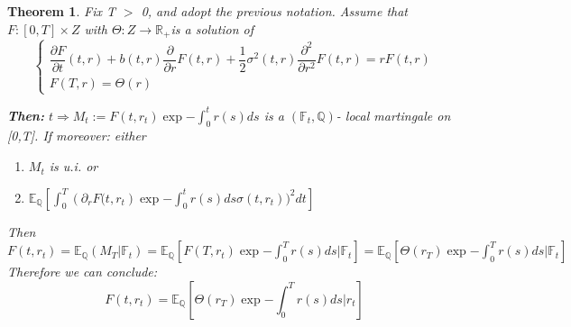 \documentclass[10pt, oneside, reqno]{amsbook}
\theoremstyle{plain}%
\newtheorem{thm}{Theorem}[chapter]
\theoremstyle{definition}
\theoremstyle{rem}
\theoremstyle{definition}
\def\Qbb{\ensuremath{\mathbb{Q}}}
\def\Rbb{\ensuremath{\mathbb{R}}}
\newcommand{\gt}{>}
\newcommand{\F}{\mathbb{F}}
\numberwithin{equation}{chapter}
\begin{document}
\begin{thm}
 Fix T $\gt$ 0, and adopt the previous notation. Assume that
$F:[0,T] \times Z$ with $\Theta: Z \rightarrow \Rbb_{+}$is a solution of 
\begin{equation}\label{pde}
\begin{cases}
 \dfrac{\partial F}{\partial t} (t,r) + b(t,r) \dfrac{\partial}{\partial r} F(t,r) + \dfrac{1}{2} \sigma^{2}
(t,r) \dfrac{\partial^{2}}{\partial r^{2}} F(t,r) = rF(t,r) \\
F(T,r) = \Theta(r)
\end{cases}
\end{equation}

\textbf{Then:} $t \Rightarrow M_{t}:= F(t,r_{t})\exp{-\int_{0}^{t}r(s)ds}$ is a $(\F_t, \Qbb)$- local martingale
on [0,T]. If moreover: 
either 

\begin{enumerate}\label{check}
 \item $M_t$ is u.i. or 
\item $\mathbb{E}_{\Qbb}\left[ \int_0^T 
\left(\partial_{r} F(t, r_{t}\right)\exp{-\int_{0}^{t}r(s)ds}\sigma(t, r_{t}))^{2}dt\right]$

\end{enumerate}

Then $F(t, r_{t}) = \mathbb{E}_{\Qbb}(M_{T} | \F_t) = \mathbb{E}_{\Qbb} \left[F(T,r_{t})
\exp{-\int_{0}^{T}} r(s) ds |\F_t\right]= \mathbb{E}_{\Qbb} \left[\Theta(r_{T}) 
\exp{-\int_{0}^{T}} r(s) ds |\F_{t}\right]$
Therefore we can conclude: 
\begin{displaymath}
F(t, r_{t}) = \mathbb{E}_{\Qbb} \left[\Theta(r_{T}) 
\exp{-\int_{0}^{T}} r(s) ds |r_{t}\right]
\end{displaymath}
\end{thm}
\end{document}
